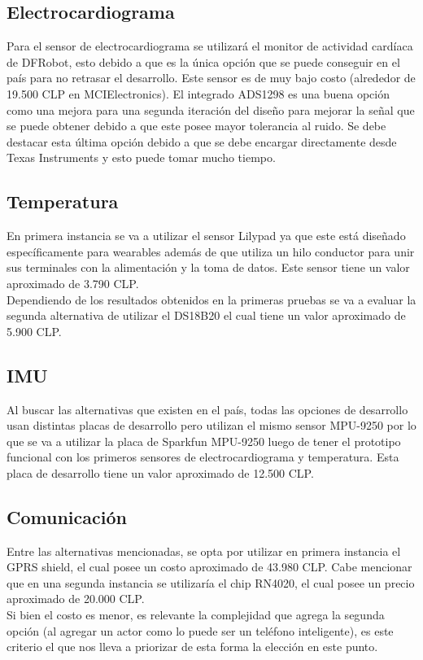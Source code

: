 \subsection{Electrocardiograma}
Para el sensor de electrocardiograma se utilizará el monitor de actividad cardíaca de DFRobot, esto debido a que es la única opción que se puede conseguir en el país para no retrasar el desarrollo. Este sensor es de muy bajo costo (alrededor de 19.500 CLP en MCIElectronics).
El integrado ADS1298 es una buena opción como una mejora para una segunda iteración del diseño para mejorar la señal que se puede obtener debido a que este posee mayor tolerancia al ruido. Se debe destacar esta última opción debido a que se debe encargar directamente desde Texas Instruments y esto puede tomar mucho tiempo.
\subsection{Temperatura}
En primera instancia se va a utilizar el sensor Lilypad ya que este está diseñado específicamente para wearables además de que utiliza un hilo conductor para unir sus terminales con la alimentación y la toma de datos. Este sensor tiene un valor aproximado de 3.790 CLP.\\
Dependiendo de los resultados obtenidos en la primeras pruebas se va a evaluar la segunda alternativa de utilizar el DS18B20 el cual tiene un valor aproximado de 5.900 CLP.
\subsection{IMU}
Al buscar las alternativas que existen en el país, todas las opciones de desarrollo usan distintas placas de desarrollo pero utilizan el mismo sensor MPU-9250 por lo que se va a utilizar la placa de Sparkfun MPU-9250 luego de tener el prototipo funcional con los primeros sensores de electrocardiograma y temperatura. Esta placa de desarrollo tiene un valor aproximado de 12.500 CLP.
\subsection{Comunicación}
Entre las alternativas mencionadas, se opta por utilizar en primera instancia el GPRS shield, el cual posee un costo aproximado de 43.980 CLP.
Cabe mencionar que en una segunda instancia se utilizaría el chip RN4020, el cual posee un precio aproximado de 20.000 CLP.\\
Si bien el costo es menor, es relevante la complejidad que agrega la segunda opción (al agregar un actor como lo puede ser un teléfono inteligente), es este criterio el que nos lleva a priorizar de esta forma la elección en este punto.